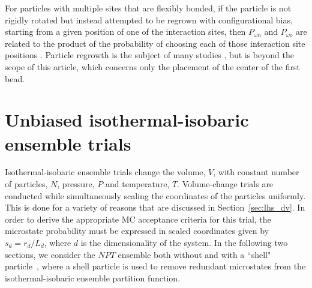 \documentclass[
  9pt,
  bestpractices,
]{livecoms}
\begin{document}
For particles with multiple sites that are flexibly bonded, if the particle is not rigidly rotated but instead attempted to be regrown with configurational bias, starting from a given position of one of the interaction sites, then $P_{\omega n}$ and $P_{\omega o}$ are related to the product of the probability of choosing each of those interaction site positions \cite{rosenbluth_monte_1955, frenkel_understanding_2002}.
Particle regrowth is the subject of many studies \cite{martin_novel_1999, martin_using_2006, sepehri_improving_2017, sepehri_improving_2017-1}, but is beyond the scope of this article, which concerns only the placement of the center of the first bead.



\section{\label{sec:rhs_npt}Unbiased isothermal-isobaric ensemble trials}

Isothermal-isobaric ensemble trials change the volume, $V$, with constant number of particles, $N$, pressure, $P$ and temperature, $T$.
Volume-change trials are conducted while simultaneously scaling the coordinates of the particles uniformly.
This is done for a variety of reasons that are discussed in Section~\ref{sec:lhs_dv}.
In order to derive the appropriate MC acceptance criteria for this trial, the microstate probability must be expressed in scaled coordinates given by $s_d = r_d/L_d$, where $d$ is the dimensionality of the system.
In the following two sections, we consider the $NPT$ ensemble both without and with a ``shell" particle~\cite{koper_length_1996, corti_deriving_1998, hatch_theory_2024}, where a shell particle is used to remove redundant microstates from the isothermal-isobaric ensemble partition function.
\end{document}
